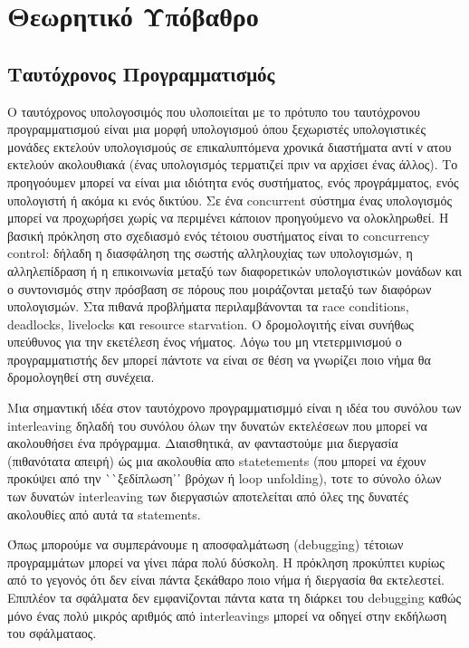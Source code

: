 \chapter{Θεωρητικό Υπόβαθρο}
\label{sec:background}

\section{Ταυτόχρονος Προγραμματισμός}

Ο ταυτόχρονος υπολογοσιμός που υλοποιείται με το πρότυπο του ταυτόχρονου προγραμματισμού είναι μια μορφή υπολογισμού όπου ξεχωριστές υπολογιστικές μονάδες εκτελούν υπολογισμούς
σε επικαλυπτόμενα χρονικά διαστήματα αντί ν ατου εκτελούν ακολουθιακά (ένας υπολογισμός τερματιζεί πριν να αρχίσει ένας άλλος).
Το προηγοόυμεν μπορεί να είναι μια ιδιότητα ενός συστήματος, ενός προγράμματος, ενός υπολογιστή ή ακόμα κι ενός δικτύου. 
Σε ένα concurrent σύστημα ένας υπολογισμός μπορεί να προχωρήσει χωρίς να περιμένει κάποιον προηγούμενο να ολοκληρωθεί. 
Η βασική πρόκληση στο σχεδιασμό ενός τέτοιου συστήματος είναι το  concurrency control: δήλαδη η διασφάληση της σωστής αλληλουχίας των υπολογισμών, η αλληλεπίδραση
ή η επικοινωνία μεταξύ των διαφορετικών υπολογιστικών μονάδων και ο συντονισμός στην πρόσβαση σε πόρους που μοιράζονται μεταξύ των διαφόρων υπολογισμών.
Στα πιθανά προβλήματα περιλαμβάνονται τα race conditions, deadlocks, livelocks και resource starvation.
Ο δρομολογιτής είναι συνήθως υπεύθυνος για την εκετέλεση ένος νήματος. Λόγω του μη ντετερμινισμού ο προγραμματιστής δεν μπορεί πάντοτε να είναι σε θέση να γνωρίζει ποιο νήμα
θα δρομολογηθεί στη συνέχεια.

Μια σημαντική ιδέα στον ταυτόχρονο προγραμματισμμό είναι η ιδέα του συνόλου των interleaving δηλαδή του συνόλου όλων την δυνατών εκτελέσεων που μπορεί να ακολουθήσει ένα πρόγραμμα.
Διαισθητικά, αν φανταστούμε μια διεργασία (πιθανότατα απειρή) ώς μια ακολουθία απο statetements (που μπορεί να έχουν προκύψει από την ``ξεδίπλωση᾽᾽ βρόχων ή  loop unfolding),
τοτε το σύνολο όλων των δυνατών interleaving των διεργασιών αποτελείται από όλες της δυνατές ακολουθίες από αυτά τα statements.

Όπως μπορούμε να συμπεράνουμε η αποσφαλμάτωση (debugging) τέτοιων προγραμμάτων μπορεί να γίνει πάρα πολύ δύσκολη. Η πρόκληση προκύπτει κυρίως από το γεγονός ότι δεν είναι πάντα
ξεκάθαρο ποιο νήμα ή διεργασία θα εκτελεστεί. Επιπλέον τα σφάλματα δεν εμφανίζονται πάντα κατα τη διάρκει του debugging καθώς μόνο ένας πολύ μικρός αριθμός από interleavings μπορεί
να οδηγεί στην εκδήλωση του σφάλματαος.


